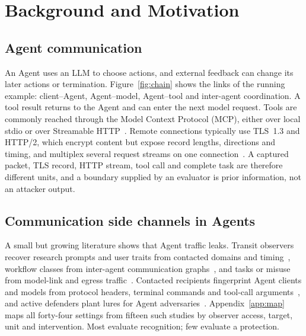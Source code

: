 \section{Background and Motivation}\label{sec:background}

\subsection{Agent communication}
An Agent uses an LLM to choose actions, and external feedback can change its later actions or termination. Figure~\ref{fig:chain} shows the links of the running example: client--Agent, Agent--model, Agent--tool and inter-agent coordination. A tool result returns to the Agent and can enter the next model request. Tools are commonly reached through the Model Context Protocol (MCP), either over local stdio or over Streamable HTTP~\cite{mcp2025transports}. Remote connections typically use TLS~1.3 and HTTP/2, which encrypt content but expose record lengths, directions and timing, and multiplex several request streams on one connection~\cite{rfc8446,rfc9113}. A captured packet, TLS record, HTTP stream, tool call and complete task are therefore different units, and a boundary supplied by an evaluator is prior information, not an attacker output.

\subsection{Communication side channels in Agents}
A small but growing literature shows that Agent traffic leaks. Transit observers recover research prompts and user traits from contacted domains and timing~\cite{jeong2026wra}, workflow classes from inter-agent communication graphs~\cite{dangol2026workflow}, and tasks or misuse from model-link and egress traffic~\cite{pouryousef2026traffic,li2026ant,agentprint2025}. Contacted recipients fingerprint Agent clients and models from protocol headers, terminal commands and tool-call arguments~\cite{kang2026whoseagent,fayolle2026webagents,ediga2026trace,zhao2026agenttrace,duan2026privacytrace}, and active defenders plant lures for Agent adversaries~\cite{ayzenshteyn2025cheat,reworr2024honeypot}. Appendix~\ref{app:map} maps all forty-four settings from fifteen such studies by observer access, target, unit and intervention. Most evaluate recognition; few evaluate a protection.

